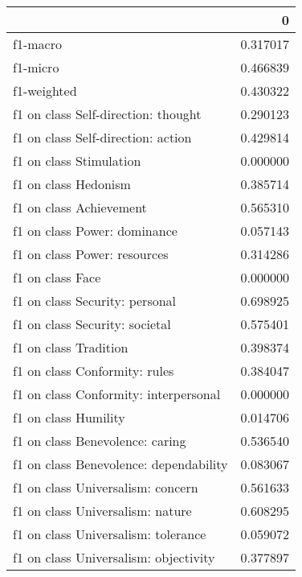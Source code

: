 \begin{tabular}{lr}
\toprule
{} &         0 \\
\midrule
f1-macro                               &  0.317017 \\
f1-micro                               &  0.466839 \\
f1-weighted                            &  0.430322 \\
f1 on class Self-direction: thought    &  0.290123 \\
f1 on class Self-direction: action     &  0.429814 \\
f1 on class Stimulation                &  0.000000 \\
f1 on class Hedonism                   &  0.385714 \\
f1 on class Achievement                &  0.565310 \\
f1 on class Power: dominance           &  0.057143 \\
f1 on class Power: resources           &  0.314286 \\
f1 on class Face                       &  0.000000 \\
f1 on class Security: personal         &  0.698925 \\
f1 on class Security: societal         &  0.575401 \\
f1 on class Tradition                  &  0.398374 \\
f1 on class Conformity: rules          &  0.384047 \\
f1 on class Conformity: interpersonal  &  0.000000 \\
f1 on class Humility                   &  0.014706 \\
f1 on class Benevolence: caring        &  0.536540 \\
f1 on class Benevolence: dependability &  0.083067 \\
f1 on class Universalism: concern      &  0.561633 \\
f1 on class Universalism: nature       &  0.608295 \\
f1 on class Universalism: tolerance    &  0.059072 \\
f1 on class Universalism: objectivity  &  0.377897 \\
\bottomrule
\end{tabular}
